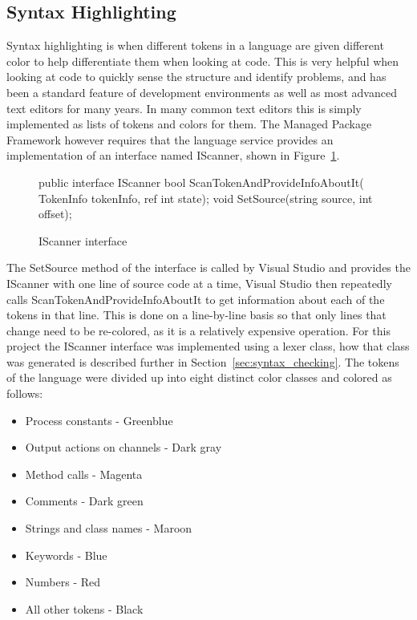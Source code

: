 	\subsection{Syntax Highlighting}
	Syntax highlighting is when different tokens in a language are given 
	different color to help differentiate them when looking at code. This
	is very helpful when looking at code to quickly sense the structure and
	identify problems, and has been a standard feature of development 
	environments as well as most advanced text editors for many years. In many
	common text editors this is simply implemented as lists of tokens and 
	colors for them. The Managed Package Framework however requires that the 
	language service provides an implementation of an interface named 
	\textsf{IScanner}, shown in Figure~\ref{fig:iscanner}. 

	\begin{figure}
	\begin{csharp}
  public interface IScanner {
    bool ScanTokenAndProvideInfoAboutIt(
    		TokenInfo tokenInfo, ref int state);
    void SetSource(string source, int offset);
  }	
\end{csharp}
	\caption{IScanner interface}
	\label{fig:iscanner}
\end{figure}

	The \textsf{SetSource} method of the interface is called by Visual Studio 
	and provides the \textsf{IScanner} with one line of source code at a time, 
	Visual Studio then repeatedly calls \textsf{ScanTokenAndProvideInfoAboutIt} 
	to get information about each of the tokens in that line. This is done on a 
	line-by-line basis so that only lines that change need to be re-colored, as 
	it is a relatively expensive operation. For this project the 
	\textsf{IScanner} interface was implemented using a lexer class, how that 
	class was generated is described further in 
	Section~\ref{sec:syntax_checking}. The tokens of the language were divided 
	up into eight distinct color classes and colored as follows:
	
	\begin{itemize}
		\item Process constants - Greenblue
		\item Output actions on channels	- Dark gray
		\item Method calls - Magenta
		\item Comments - Dark green
		\item Strings and class names - Maroon
		\item Keywords - Blue
		\item Numbers - Red
		\item All other tokens - Black
	\end{itemize}

